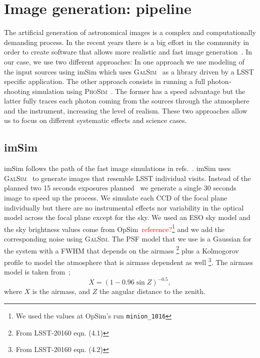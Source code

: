 \documentclass[\docopts]{\docclass}
\begin{document}
\section{Image generation: pipeline}
\label{sec:image_generation_pipeline}

The artificial generation of astronomical images is a complex and computationally demanding process. In the recent
years there is a big effort in the community in order to create software that allows more realistic and fast image
generation~\citep{2016MNRAS.457..786S,2016ApJ...817...25B}. In our case, we use two different approaches: In one approach
we use modeling of the input sources using imSim which uses \textsc{GalSim}~\citep{2015A&C....10..121R} as a library driven
by a LSST specific application. The other approach consists in
running a full photon-shooting simulation using \textsc{PhoSim}~\citep{2015ApJS..218...14P}. The former has a speed
advantage but the latter fully traces each photon coming from the sources through the atmosphere and the instrument,
increasing the level of realism. These two approaches allow us to focus on different systematic effects and science cases.

\subsection{imSim}
\label{sec:imsim_pipeline}

imSim follows the path of the fast image simulations in refs.~\citep{2016MNRAS.457..786S,2016ApJ...817...25B}.
imSim uses \textsc{GalSim}~\citep{2015A&C....10..121R} to generate images that resemble LSST individual visits. Instead of the
planned two 15 seconds exposures planned~\citep{2008arXiv0805.2366I} we generate a single 30 seconds image to speed up the process.
We simulate each CCD of the focal plane individually but there are no instrumental effects nor variability in the optical model
across the focal plane except for the sky. We used an ESO sky model and the sky brightness values come from
OpSim~\textcolor{red}{reference?}\footnote{We used the values at OpSim's run \texttt{minion\_1016}} and we add the corresponding
noise using \textsc{GalSim}. The PSF model that we use is a Gaussian for the system with a FWHM that depends on the airmass
\footnote{From LSST-20160 eqn. (4.1)} plus a Kolmogorov profile to model the atmosphere that is airmass dependent as well
\footnote{From LSST-20160 eqn. (4.2)}. The airmass model is taken from~\citep{1991PASP..103.1033K};
\begin{equation}
X = (1 - 0.96\sin{Z})^{-0.5},
\end{equation}
where $X$ is the airmass, and $Z$ the angular distance to the zenith.
\end{document}
